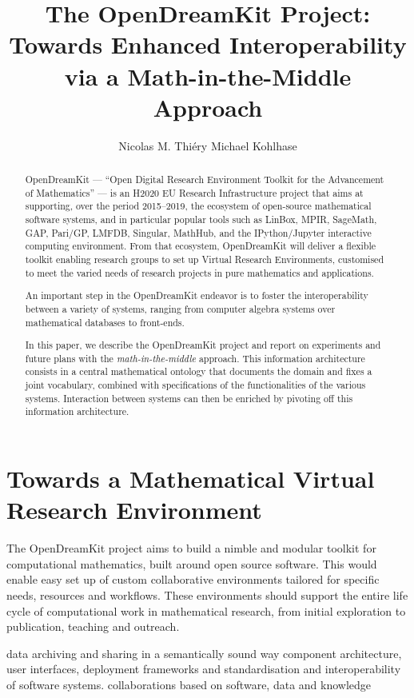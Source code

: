\documentclass{llncs}
\title{The OpenDreamKit Project:\\
  Towards Enhanced Interoperability\\
  via a Math-in-the-Middle Approach}
\author{Nicolas M. Thi\'ery\inst{1} Michael Kohlhase\inst{2}}
\institute{Universit\'e Paris-Sud, Paris, France\and
Jacobs University, Bremen, Germany}
\begin{document}
\maketitle
\begin{abstract}
  OpenDreamKit --- ``Open Digital Research Environment Toolkit for the
  Advancement of Mathematics'' --- is an H2020 EU Research
  Infrastructure project that aims at supporting, over the period
  2015--2019, the ecosystem of open-source mathematical software
  systems, and in particular popular tools such as LinBox, MPIR,
  SageMath, GAP, Pari/GP, LMFDB, Singular, MathHub, and the
  IPython/Jupyter interactive computing environment. From that
  ecosystem, OpenDreamKit will deliver a flexible toolkit enabling
  research groups to set up Virtual Research Environments, customised
  to meet the varied needs of research projects in pure mathematics
  and applications.

  An important step in the OpenDreamKit endeavor is to foster the
  interoperability between a variety of systems, ranging from computer
  algebra systems over mathematical databases to front-ends.

  In this paper, we describe the OpenDreamKit project and report on experiments and future
  plans with the \emph{math-in-the-middle} approach.  This information architecture
  consists in a central mathematical ontology that documents the domain and fixes a joint
  vocabulary, combined with specifications of the functionalities of the various
  systems. Interaction between systems can then be enriched by pivoting off this
  information architecture.
\end{abstract}

\section{Towards a Mathematical Virtual Research Environment}
The OpenDreamKit project aims to build a nimble and modular toolkit for computational mathematics, built around open source software. This would enable easy set up of custom collaborative environments tailored for specific needs, resources and workflows. These environments should support the entire life cycle of computational work in mathematical research, from initial exploration to publication, teaching and outreach. 

data archiving and sharing in a semantically sound way
component architecture, user interfaces, deployment frameworks and standardisation and interoperability of software systems.
collaborations based on software, data and knowledge
\end{document}
